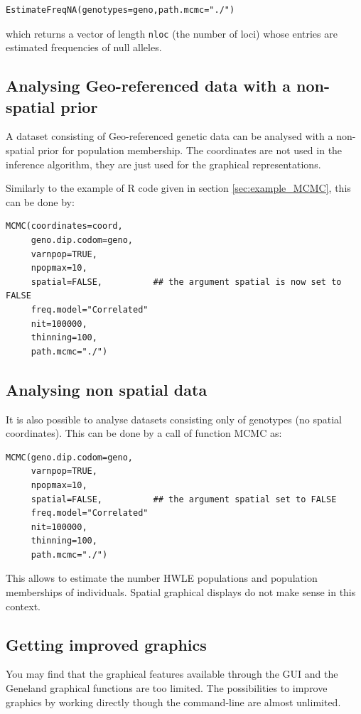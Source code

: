\documentclass[a4paper,10pt]{article}
\begin{document}
\begin{verbatim}
EstimateFreqNA(genotypes=geno,path.mcmc="./")
\end{verbatim}



which returns  a vector of length \texttt{nloc} (the number of loci) whose entries
  are estimated frequencies of null alleles.



\subsection[Non-spatial prior]{Analysing Geo-referenced data with a non-spatial prior}

A dataset consisting of Geo-referenced genetic data can be analysed with a non-spatial prior for population membership. 
The coordinates are not used in the inference algorithm, they are just used for the graphical representations. 

Similarly to the example of R code given in section \ref{sec:example_MCMC}, this can be done by:

\begin{verbatim}
MCMC(coordinates=coord,
     geno.dip.codom=geno,
     varnpop=TRUE, 
     npopmax=10,
     spatial=FALSE,          ## the argument spatial is now set to FALSE
     freq.model="Correlated"
     nit=100000,
     thinning=100,
     path.mcmc="./")
\end{verbatim}


\subsection{Analysing non spatial data}

It is also possible to analyse datasets consisting only of genotypes (no spatial coordinates). 
This can be done by  a call of function MCMC as:


\begin{verbatim}
MCMC(geno.dip.codom=geno, 
     varnpop=TRUE, 
     npopmax=10,
     spatial=FALSE,          ## the argument spatial set to FALSE
     freq.model="Correlated"
     nit=100000,
     thinning=100,
     path.mcmc="./")
\end{verbatim}



This allows to estimate the number HWLE populations and population memberships of individuals. 
Spatial graphical displays do not make sense in this context. 

\subsection{Getting improved graphics}
You may find that the graphical features available through the GUI and the {\sc Geneland} graphical functions are too limited. 
The possibilities to improve graphics by working directly though the command-line  are almost unlimited.
\end{document}
